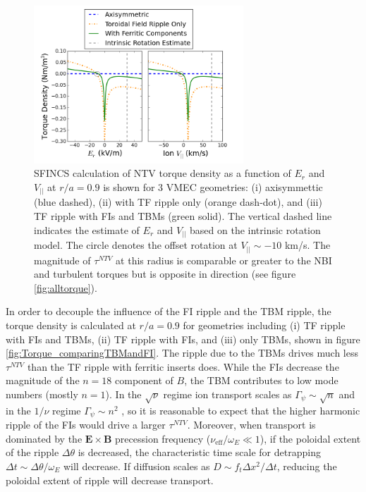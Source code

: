 \documentclass{article}
\begin{document}
\begin{figure}[h!]
\centering
\includegraphics[width=0.7\textwidth]{Torque_ErandV.png}
\caption{\label{fig:Torque_ErandV} SFINCS calculation of NTV torque density as a function of $E_r$ and $V_{||}$ at $r/a = 0.9$ is shown for 3 VMEC geometries: (i) axisymmettic (blue dashed), (ii) with TF ripple only (orange dash-dot), and (iii) TF ripple with FIs and TBMs (green solid). The vertical dashed line indicates the estimate of $E_r$ and $V_{||}$ based on the intrinsic rotation model. The circle denotes the offset rotation at $V_{||} \sim -10$ km/s. The magnitude of $\tau^{NTV}$ at this radius is comparable or greater to the NBI and turbulent torques but is opposite in direction (see figure \ref{fig:alltorque}). }
\end{figure}

In order to decouple the influence of the FI ripple and the TBM ripple, the torque density is calculated at $r/a = 0.9$ for geometries including (i) TF ripple with FIs and TBMs, (ii) TF ripple with FIs, and (iii) only TBMs, shown in figure \ref{fig:Torque_comparingTBMandFI}. The ripple due to the TBMs drives much less $\tau^{NTV}$ than the TF ripple with ferritic inserts does.  While the FIs decrease the magnitude of the $n = 18$ component of $B$, the TBM contributes to low mode numbers (mostly $n = 1$). In the $\sqrt{\nu}$ regime ion transport scales as $\Gamma_{\psi} \sim \sqrt{n}$ and in the $1/\nu$ regime $\Gamma_{\psi} \sim n^2$ \cite{Shaing2010}, so it is reasonable to expect that the higher harmonic ripple of the FIs would drive a larger $\tau^{NTV}$. Moreover, when transport is dominated by the $\bm{E} \times \bm{B}$ precession frequency ($\nu_{\text{eff}}/\omega_E \ll 1$), if the poloidal extent of the ripple $\Delta \theta$ is decreased, the characteristic time scale for detrapping $\Delta t \sim \Delta \theta/ \omega_E$ will decrease. If diffusion scales as $D \sim f_t \Delta x^2/\Delta t$, reducing the poloidal extent of ripple will decrease transport. 
\end{document}
